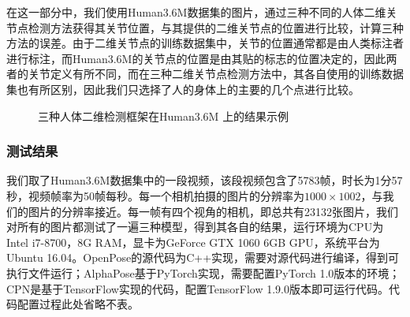 在这一部分中，我们使用Human3.6M数据集的图片，通过三种不同的人体二维关节点检测方法获得其关节位置，与其提供的二维关节点的位置进行比较，计算三种方法的误差。由于二维关节点的训练数据集中，关节的位置通常都是由人类标注者进行标注，而Human3.6M的关节点的位置是由其贴的标志的位置决定的，因此两者的关节定义有所不同，而在三种二维关节点检测方法中，其各自使用的训练数据集也有所区别，因此我们只选择了人的身体上的主要的几个点进行比较。
\begin{figure}[htbp]
    \centering
    \caption{三种人体二维检测框架在Human3.6M \cite{ionescu2014human}上的结果示例\label{fig:h36mres}}
\end{figure}

\subsubsection{测试结果}
我们取了Human3.6M数据集中的一段视频，该段视频包含了5783帧，时长为1分57秒，视频帧率为50帧每秒。每一个相机拍摄的图片的分辨率为\(1000\times 1002\)，与我们的图片的分辨率接近。每一帧有四个视角的相机，即总共有23132张图片，我们对所有的图片都测试了一遍三种模型，得到其各自的结果，运行环境为CPU为 Intel i7-8700，8G RAM，显卡为GeForce GTX 1060 6GB GPU，系统平台为Ubuntu 16.04。OpenPose的源代码为C++实现，需要对源代码进行编译，得到可执行文件运行；AlphaPose基于PyTorch实现，需要配置PyTorch 1.0版本的环境；CPN是基于TensorFlow实现的代码，配置TensorFlow 1.9.0版本即可运行代码。代码配置过程此处省略不表。


